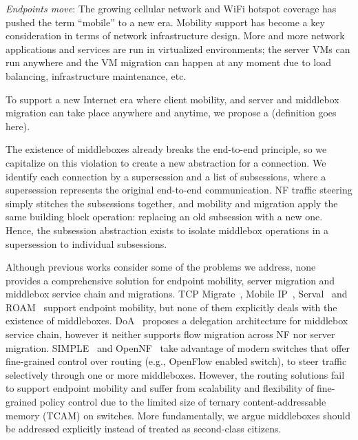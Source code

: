 

\textit{Endpoints move}: The growing cellular network and WiFi hotspot
coverage has  pushed  the term   ``mobile''  to a   new era.  Mobility
support has  become  a   key   consideration   in terms  of    network
infrastructure  design. More and  more network applications and services  are run in
virtualized environments; the server VMs  can run anywhere and the VM
migration    can   happen at  any  moment    due   to load  balancing,
infrastructure maintenance, etc.

To  support a new Internet  era where client  mobility, and server and
middlebox migration can take place anywhere and  anytime, we propose a
\system (definition goes here).

The  existence  of middleboxes  already  breaks the
end-to-end principle, so we capitalize  on this violation to create  a
new  abstraction for a connection.  We  identify  each connection by a
supersession and  a list  of   subsessions, where  a   supersession
represents  the original  end-to-end communication. NF  traffic
steering simply stitches  the subsessions together, and  mobility and
migration apply the  same  building block  operation:  replacing an old
subsession with a new  one. Hence, the subsession abstraction exists
to   isolate  middlebox operations in   a  supersession to individual
subsessions.  




Although previous works consider some of the problems we address, none
provides  a  comprehensive  solution  for   endpoint  mobility, server
migration    and  middlebox  service     chain  and  migrations.   TCP
Migrate~\cite{TCPMobile}, Mobile IP~\cite{mip},   Serval~\cite{serval}
and ROAM~\cite{I3Mobile}  support endpoint mobility,  but none of them
explicitly deals  with the existence  of middleboxes. DoA~\cite{DOA} proposes a delegation architecture
for   middlebox  service  chain,   however  it  neither  supports flow
migration     across     NF       nor    server    migration.
SIMPLE~\cite{SIMPLE} and OpenNF~\cite{OpenNF} take advantage of modern
switches that offer fine-grained control  over routing (e.g., OpenFlow
enabled  switch),  to steer traffic selectively  through  one  or more
middleboxes.  However, the  routing solutions fail to support endpoint
mobility and  suffer from scalability  and flexibility of fine-grained
policy control due to the limited  size of ternary content-addressable
memory  (TCAM) on switches.  More  fundamentally, we argue middleboxes
should be  addressed explicitly  instead  of treated  as  second-class
citizens.

